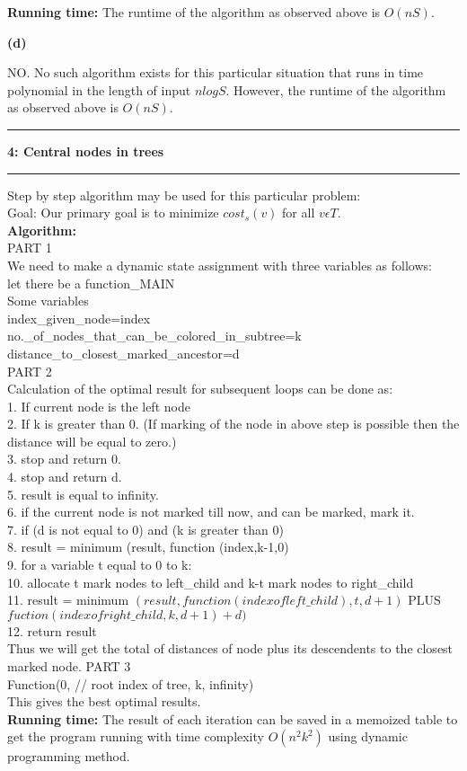 \documentclass[11pt]{article}
\newcommand\question[2]{\vspace{.25in}\hrule\textbf{#1: #2}\vspace{.5em}\hrule\vspace{.10in}}
\renewcommand\part[1]{\vspace{.10in}\textbf{(#1)}}
\newcommand\algorithm{\vspace{.10in}\textbf{Algorithm: }}
\newcommand\runtime{\vspace{.10in}\textbf{Running time: }}
\begin{document}
\runtime The runtime of the algorithm as observed above is $O(nS)$.

\part{d}

NO. No such algorithm exists for this particular situation that runs in time polynomial in the length of input $nlogS$. However, the runtime of the algorithm as observed above is $O(nS)$.

\question{4}{Central nodes in trees}
Step by step algorithm may be used for this particular problem:
\\Goal: Our primary goal is to minimize $cost_s(v)$ for all $v\epsilon T$.\\
\algorithm\\ 
PART 1\\
We need to make a dynamic state assignment with three variables as follows:\\
let there be  a function\_MAIN\\
Some variables\\
index\_given\_node=index\\
no.\_of\_nodes\_that\_can\_be\_colored\_in\_subtree=k\\
distance\_to\_closest\_marked\_ancestor=d\\
PART 2\\
Calculation of the optimal result for subsequent loops can be done as:\\
1. If current node is the left node\\
2. \quad If k is greater than 0. (If marking of the node in above step is possible then the distance will be equal to zero.)\\
3. \qquad stop and return 0.\\
4. \quad stop and return d.\\
5. result is equal to infinity.\\
6. if the current node is not marked till now, and can be marked, mark it.\\
7. if (d is not equal to 0) and (k is greater than 0)\\
8. \quad result = minimum (result, function (index,k-1,0)\\
9. for a variable t equal to 0 to k: \\
10. allocate t mark nodes to left\_child and k-t mark nodes to right\_child\\
11. \quad result = minimum $(result, function (index of left\_child), t, d+1)$ PLUS $fuction(index of right\_child, k, d+1) + d)$\\
12. return result\\
Thus we will get the total of distances of node plus its descendents to the closest marked node.
PART 3\\
Function(0, // root index of tree, k, infinity) 
\\This gives the best optimal results.\\
\runtime The result of each iteration can be saved in a memoized table to get the program running with time complexity $O(n^2k^2)$ using dynamic programming method.
\end{document}
